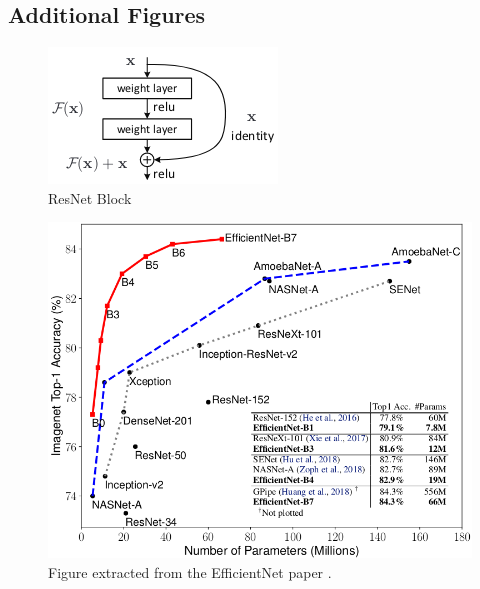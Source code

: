 \documentclass[11pt,twocolumn,letterpaper]{article}
\begin{document}
\subsection{Additional Figures}

\begin{figure}[ht]
    \centering
    \includegraphics[width=0.7\linewidth]{resnetBlock.png}
    \caption{ResNet Block \cite{heDeepResidualLearning2015}}
    \label{fig:resnetBlock}
\end{figure}

\begin{figure}[!ht]
    \centering
    \includegraphics[width=1\linewidth]{efficientNet.png}
    \caption{Figure extracted from the EfficientNet paper \cite{tanEfficientNetRethinkingModel2020}.}
    \label{fig:efficientNet}
\end{figure}
\end{document}
